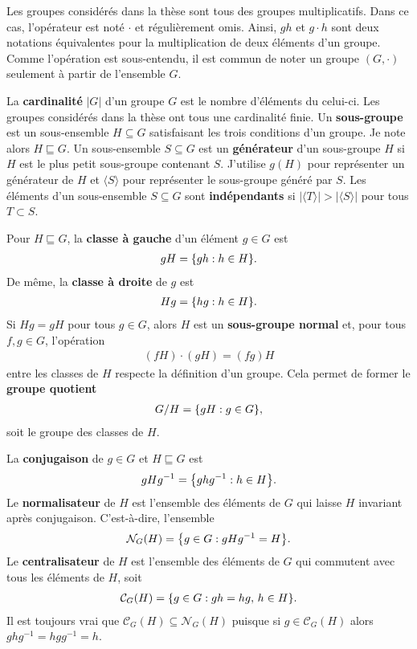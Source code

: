 Les groupes considérés dans la thèse sont tous des groupes multiplicatifs.
Dans ce cas, l'opérateur est noté $\cdot$ et régulièrement omis.
Ainsi, $gh$ et $g \cdot h$ sont deux notations équivalentes pour la multiplication 
de deux éléments d'un groupe.
Comme l'opération est sous-entendu,
il est commun de noter un groupe $(G, \cdot)$ seulement à partir de l'ensemble $G$.

La \textbf{cardinalité} $|G|$ d'un groupe $G$ est le nombre d'éléments du celui-ci.
Les groupes considérés dans la thèse ont tous une cardinalité finie.
Un \textbf{sous-groupe} est un sous-ensemble $H \subseteq G$ satisfaisant les trois conditions
d'un groupe.
Je note alors $H \sqsubseteq G$.
Un sous-ensemble $S \subseteq G$ est un \textbf{générateur} d'un sous-groupe $H$ si $H$ est le plus petit
sous-groupe contenant $S$.
J'utilise $g(H)$ pour représenter un générateur de $H$ 
et $\langle S \rangle$ pour représenter le sous-groupe généré par $S$.
Les éléments d'un sous-ensemble $S \subseteq G$ sont \textbf{indépendants} si 
$|\langle T \rangle| > |\langle S \rangle|$ pour tous $T \subset S$.

Pour $H \sqsubseteq G$,
la \textbf{classe à gauche} d'un élément $g \in G$ est
\begin{align}
  gH = \qty{gh : h \in H}.
\end{align}
De même,
la \textbf{classe à droite} de $g$ est 
\begin{align}
  Hg = \qty{hg : h \in H}.
\end{align}
Si $Hg = gH$ pour tous $g \in G$,
alors $H$ est un \textbf{sous-groupe normal} et,
pour tous $f, g \in G$, l'opération
\begin{align}
  (fH)\cdot(gH) = (fg)H
\end{align}
entre les classes de $H$ respecte la définition d'un groupe.
Cela permet de former le \textbf{groupe quotient} 
\begin{align}
  G / H = \qty{gH : g \in G},
\end{align}
soit le groupe des classes de $H$.

La \textbf{conjugaison} de $g \in G$ et $H \sqsubseteq G$ est 
\begin{align}
  gHg^{-1} = \qty{ghg^{-1} : h \in H}.
\end{align}
Le \textbf{normalisateur} de $H$ est l'ensemble des éléments de $G$ qui laisse $H$
invariant après conjugaison.
C'est-à-dire, l'ensemble
\begin{align}
  \mathcal{N}_G(H) = \qty{g \in G : gHg^{-1} = H}.
\end{align}
Le \textbf{centralisateur} de $H$ est l'ensemble des éléments de $G$ qui commutent avec
tous les éléments de $H$, soit
\begin{align}
  \mathcal{C}_G(H) = \qty{g \in G : gh = hg,\, h \in H}.
\end{align}
Il est toujours vrai que $\mathcal{C}_G(H) \subseteq \mathcal{N}_G(H)$ puisque
si $g \in \mathcal{C}_G(H)$ alors $ghg^{-1} = hgg^{-1} = h$.

